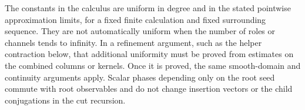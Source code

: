 \begin{remark}\label{rem:calculus-uniformity}
The constants in the calculus are uniform in degree and
in the stated pointwise approximation limits, for a
fixed finite calculation and fixed surrounding sequence.
They are not automatically uniform when the number of
roles or channels tends to infinity.  In a refinement
argument, such as the helper contraction below, that
additional uniformity must be proved from estimates on
the combined columns or kernels.  Once it is proved,
the same smooth-domain and continuity arguments apply.
Scalar phases depending only on the root seed commute
with root observables and do not change insertion
vectors or the child conjugations in the cut recursion.
\end{remark}
